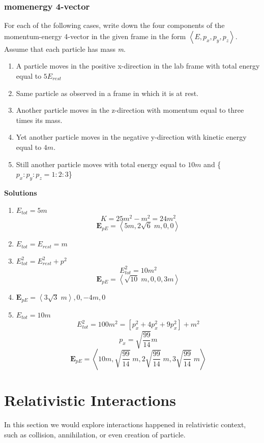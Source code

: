 \documentclass[12pt]{book}
\newcommand{\sqbkt}[1]{\left[ #1 \right]}
\newcommand{\tribkt}[1]{\left< #1 \right>}
\begin{document}
\subsubsection{momenergy 4-vector}
For each of the following cases, write down the four components of the momentum-energy 4-vector in the given frame in the form $\tribkt{E,p_x,p_y,p_z}$. Assume that each particle has mass \textit{m}. 
\begin{enumerate}
    \item A particle moves in the positive x-direction in the lab frame with total energy equal to $5E_{rest}$
    \item Same particle as observed in a frame in which it is at rest.
    \item Another particle moves in the z-direction with momentum equal to three times its mass.
    \item Yet another particle moves in the negative y-direction with kinetic energy equal to $4m$.
    \item Still another particle moves with total energy equal to $10m$ and \{$p_x:p_y:p_z = 1:2:3$\}
\end{enumerate}
\textbf{Solutions}
\begin{enumerate}
    \item \(E_{tot}=5m\)
    \[
    K = 25m^2 - m^2 = 24m^2
    \]
    \[
    \textbf{E}_{pE} = \tribkt{5m,2\sqrt{6}\;m,0,0}
    \]
    \item \( E_{tot} = E_{rest} = m\)
    \item \(E_{tot}^2 = E_{rest}^2 + p^2\)
    \[
    E_{tot}^2 = 10m^2
    \]
    \[
    \textbf{E}_{pE} = \tribkt{\sqrt{10}\; m, 0,0,3m}
    \]
    \item \( \textbf{E}_{pE} = \tribkt{3\sqrt{3}\; m},0,-4m,0\)
    \item \(E_{tot} = 10m\)
    \[
    E_{tot}^2 = 100m^2 = \sqbkt{p_x^2+4p_x^2+9p_x^2}+m^2
    \]
    \[
    p_x = \sqrt{\frac{99}{14}}m
    \]
    \[
    \textbf{E}_{pE} = \tribkt{10m,\sqrt{\frac{99}{14}}\;m,2\sqrt{\frac{99}{14}}\;m,3\sqrt{\frac{99}{14}}\;m}
    \]

\end{enumerate}


\section{Relativistic Interactions}
In this section we would explore interactions happened in relativistic context, such as collision, annihilation, or even creation of particle. 
\end{document}
